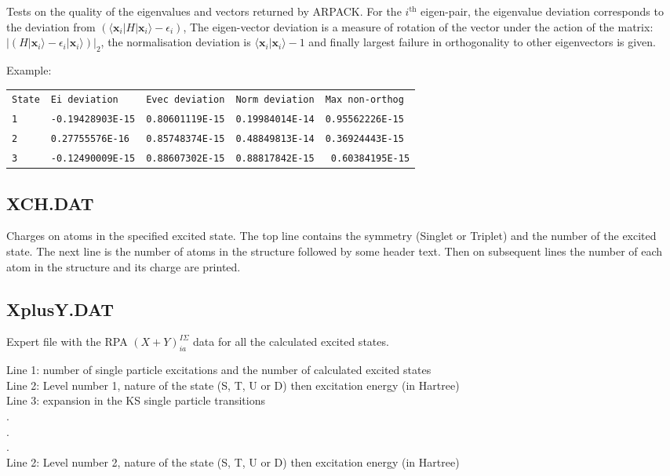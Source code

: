 Tests on the quality of the eigenvalues and vectors returned by ARPACK. For the
$i^\mathrm{th}$ eigen-pair, the eigenvalue deviation corresponds to the
deviation from $\left( \langle \mathbf{x}_i | H | \mathbf{x}_i\rangle -
\epsilon_i \right)$, The eigen-vector deviation is a measure of rotation of the
vector under the action of the matrix: $\left| \left( H | \mathbf{x}_i\rangle -
\epsilon_i | \mathbf{x}_i\rangle \right) \right|_2$, the normalisation deviation
is $\langle \mathbf{x}_i | \mathbf{x}_i\rangle - 1$ and finally largest failure
in orthogonality to other eigenvectors is given.

Example:\\
\begin{tabular}{lllll}
{\tt State} & {\tt Ei deviation} & {\tt Evec deviation} & {\tt Norm deviation} &
{\tt Max non-orthog}\\ {\tt 1} & {\tt -0.19428903E-15} & {\tt 0.80601119E-15} &
{\tt 0.19984014E-14} & {\tt 0.95562226E-15}\\ {\tt 2} & {\tt 0.27755576E-16} &
{\tt 0.85748374E-15} & {\tt 0.48849813E-14} & {\tt 0.36924443E-15}\\ {\tt 3} &
{\tt -0.12490009E-15} & {\tt 0.88607302E-15} & {\tt 0.88817842E-15} & {\tt
  0.60384195E-15}\\
\end{tabular}

\subsection{XCH.DAT}

Charges on atoms in the specified excited state. The top line contains the
symmetry (Singlet or Triplet) and the number of the excited state. The next line
is the number of atoms in the structure followed by some header text. Then on
subsequent lines the number of each atom in the structure and its charge are
printed.

\subsection{XplusY.DAT}

Expert file with the RPA  $(X+Y)^{I\Sigma}_{ia}$ data for all the calculated
excited states.

Line 1: number of single particle excitations and the number of calculated
excited states\\
Line 2: Level number 1, nature of the state (S, T, U or D) then excitation
energy (in Hartree)\\
Line 3: expansion in the KS single particle transitions\\
.\\
.\\
.\\
Line 2: Level number 2, nature of the state (S, T, U or D) then excitation
energy (in Hartree)\\

